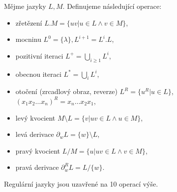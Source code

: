 \documentclass[12pt]{article}                   %
\begin{document}
    \begin{definice}
        Mějme jazyky $L, M$. Definujeme následující operace:

        \begin{itemize}
            \item zřetězení $L.M = \{uv|u \in L \land v \in M\}$,
            \item mocninu $L^0 = \{\lambda\}, L^{i+1} = L^i.L$,
            \item pozitivní iteraci $L^+ = \bigcup_{i ≥ 1}L^i$,
            \item obecnou iteraci $L^* = \bigcup_i L^i$,
            \item otočení (zrcadlový obraz, reverze) $L^R = \{u^R|u \in L\}$, $(x_1x_2…x_n)^R = x_n…x_2x_1$,
            \item levý kvocient $M\setminus L = \{v|uv \in L \land u \in M\}$,
            \item levá derivace $\partial_w L = \{w\}\setminus L$,
            \item pravý kvocient $L/M = \{u|uv \in L \land v \in M\}$,
            \item pravá derivace $\partial^R_w L = L/\{w\}$.
        \end{itemize}
    \end{definice}

    \begin{veta}
        Regulární jazyky jsou uzavřené na 10 operací výše.
    \end{veta}
\end{document}
